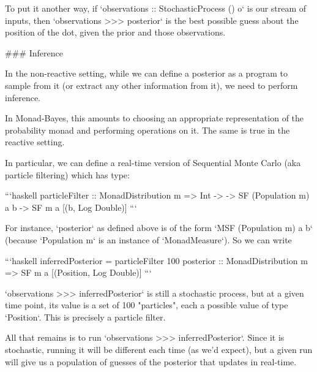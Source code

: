 To put it another way, if `observations :: StochasticProcess () o` is our stream of inputs, then `observations >>> posterior` is the best possible guess about the position of the dot, given the prior and those observations.

### Inference

In the non-reactive setting, while we can define a posterior as a program
    to sample from it (or extract any other information from it), we need to perform inference. 

In Monad-Bayes, this amounts to choosing an appropriate representation of the probability monad and performing operations on it. The same is true in the reactive setting.

In particular, we can define a real-time version of Sequential Monte Carlo (aka particle filtering) which has type:

```haskell
particleFilter :: MonadDistribution m => Int ->
  -> SF (Population m) a b
  -> SF m a [(b, Log Double)]
```

For instance, `posterior` as defined above is of the form `MSF (Population m) a b` (because `Population m` is an instance of `MonadMeasure`). So we can write

```haskell
inferredPosterior = particleFilter 100 posterior :: MonadDistribution m => SF m a [(Position, Log Double)] 
```

`observations >>> inferredPosterior` is still a stochastic process, but at a given time point, its value is a set of 100 "particles", each a possible value of type `Position`. This is precisely a particle filter.

All that remains is to run `observations >>> inferredPosterior`. Since it is stochastic, running it will be different each time (as we'd expect), but a given run will give us a population of guesses of the posterior that updates in real-time.